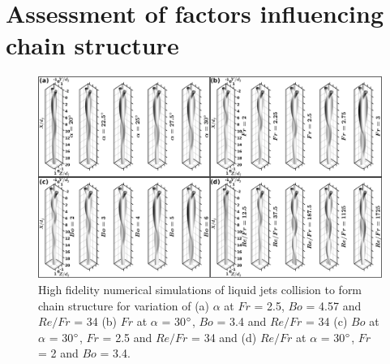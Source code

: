 \documentclass[%
 aip,
 sd,%
amsmath,amssymb,
preprint,%
author-year,%
]{revtex4-1}
\begin{document}
\section{Assessment of factors influencing chain structure}
\begin{figure}
	\centering
	\includegraphics[width=\linewidth]{Figure8}
	\caption{High fidelity numerical simulations of liquid jets collision to form chain structure for variation of (a) $\alpha$ at $Fr$ = 2.5, $Bo$ = 4.57 and $Re/Fr$ = 34 (b) $Fr$ at $\alpha$ = 30$\degree$, $Bo$ = 3.4 and $Re/Fr$ = 34 (c) $Bo$ at $\alpha$ = 30$\degree$, $Fr$ = 2.5 and $Re/Fr$ = 34 and (d) $Re/Fr$ at $\alpha$ = 30$\degree$, $Fr$ = 2 and $Bo$ = 3.4.}
	\label{Figure::phaseContours}
\end{figure}
\end{document}
